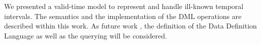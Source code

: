 We presented a valid-time model to represent and handle ill-known temporal intervals. The semantics and the implementation of the DML operations are described within this work. As future work , the definition of the Data Definition Language as well as the querying will be considered.
